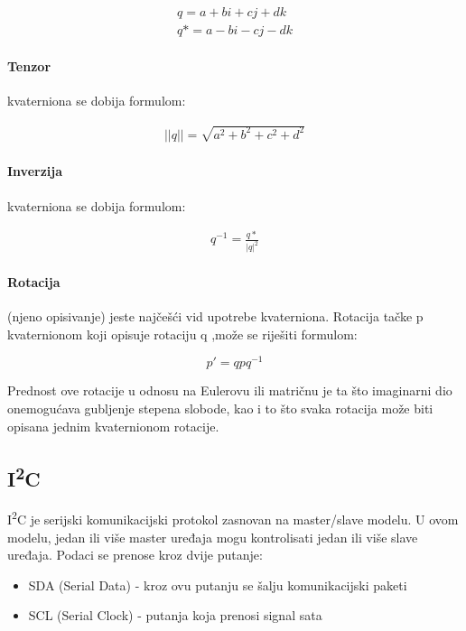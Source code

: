 \documentclass[../Document.tex]{subfiles}
\begin{document}
\begin{align*}
    q=a + bi + cj + dk \\
    q*=a - bi - cj - dk
\end{align*}

\paragraph{Tenzor}
kvaterniona se dobija formulom:

\begin{align*}
    ||q||=\sqrt{a^2 + b^2 + c^2 + d^2}
\end{align*}

\paragraph{Inverzija}
kvaterniona se dobija formulom:

\begin{align*}
    q^{-1}=\frac{q*}{|q|^2}
\end{align*}

\paragraph{Rotacija} (njeno opisivanje) jeste najčešći vid upotrebe kvaterniona. Rotacija tačke p kvaternionom koji opisuje rotaciju q ,može se riješiti formulom:

$$p'=qpq^{-1}$$

\noindent Prednost ove rotacije u odnosu na Eulerovu ili matričnu je ta što imaginarni dio onemogućava gubljenje stepena slobode, kao i to što svaka rotacija može biti opisana jednim kvaternionom rotacije.

\newcommand{\itc}{I\textsuperscript{2}C}\label{itc}
\subsection{\itc}
{\itc} je serijski komunikacijski protokol zasnovan na master/slave modelu. U ovom modelu, jedan ili više master uređaja mogu kontrolisati jedan ili više slave uređaja. Podaci se prenose kroz dvije putanje:

\begin{itemize}
    \item SDA (Serial Data) - kroz ovu putanju se šalju komunikacijski paketi
    \item SCL (Serial Clock) - putanja koja prenosi signal sata
\end{itemize}
\end{document}
